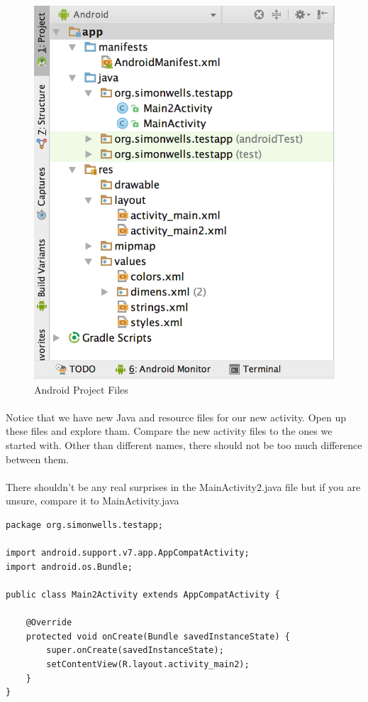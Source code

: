 \begin{figure}[H]
\centering
\includegraphics[width=\textwidth]{images/activities_project_explorer}
\caption{Android Project Files}
\label{fig:activities_project_explorer}
\end{figure}

\paragraph{} Notice that we have new Java and resource files for our new activity. Open up these files and explore tham. Compare the new activity files to the ones we started with. Other than different names, there should not be too much difference between them.

\paragraph{} There shouldn't be any real surprises in the MainActivity2.java file but if you are unsure, compare it to MainActivity.java

\begin{lstlisting}
package org.simonwells.testapp;

import android.support.v7.app.AppCompatActivity;
import android.os.Bundle;

public class Main2Activity extends AppCompatActivity {

    @Override
    protected void onCreate(Bundle savedInstanceState) {
        super.onCreate(savedInstanceState);
        setContentView(R.layout.activity_main2);
    }
}
\end{lstlisting}

